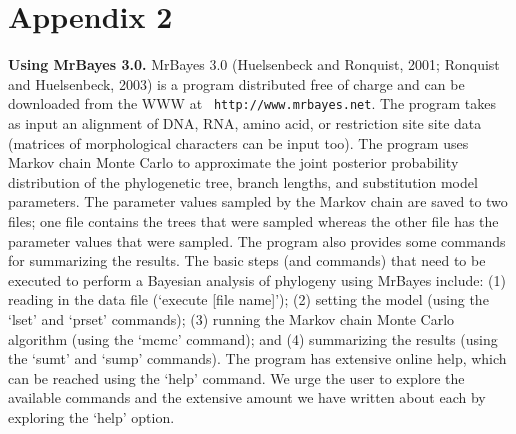 \documentclass{svmult}
\begin{document}
\newpage


\section*{Appendix 2}

{\bf Using MrBayes 3.0.} MrBayes 3.0 (Huelsenbeck and Ronquist, 2001; Ronquist and Huelsenbeck,
2003) is a program distributed free of charge and can be downloaded from the WWW at {\tt
http://www.mrbayes.net}. The program takes as input an alignment of DNA, RNA, amino acid, or
restriction site site data (matrices of morphological characters can be input too). The program
uses Markov chain Monte Carlo to approximate the joint posterior probability distribution of the
phylogenetic tree, branch lengths, and substitution model parameters. The parameter values sampled
by the Markov chain are saved to two files; one file contains the trees that were sampled whereas
the other file has the parameter values that were sampled. The program also provides some commands
for summarizing the results. The basic steps (and commands) that need to be executed to perform a
Bayesian analysis of phylogeny using MrBayes include: (1) reading in the data file (`execute [file
name]'); (2) setting the model (using the `lset' and `prset' commands); (3) running the Markov
chain Monte Carlo algorithm (using the `mcmc' command); and (4) summarizing the results (using the
`sumt' and `sump' commands).  The program has extensive online help, which can be reached using the
`help' command. We urge the user to explore the available commands and the extensive amount we have
written about each by exploring the `help' option.

\bigskip
\end{document}
